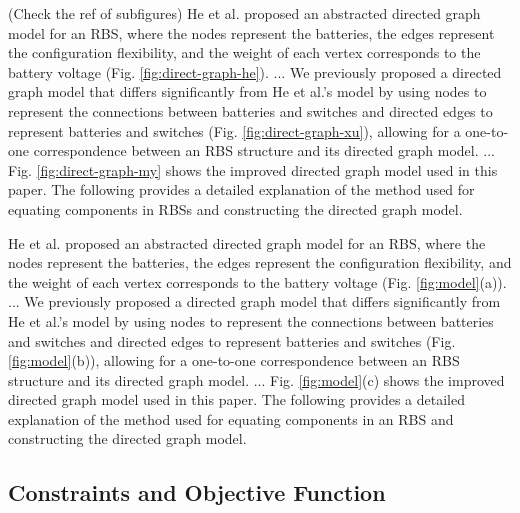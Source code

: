 \documentclass[a4paper]{article}
\begin{document}
(Check the ref of subfigures)
He et al. \cite{heExploringAdaptiveReconfiguration2013} proposed an abstracted directed graph model for an RBS, where the nodes represent the batteries, the edges represent the configuration flexibility, and the weight of each vertex corresponds to the battery voltage (Fig. \ref{fig:direct-graph-he}). 
...
We previously proposed a directed graph model that differs significantly from He et al.'s model by using nodes to represent the connections between batteries and switches and directed edges to represent batteries and switches (Fig. \ref{fig:direct-graph-xu}), allowing for a one-to-one correspondence between an RBS structure and its directed graph model. 
...
Fig. \ref{fig:direct-graph-my} shows the improved directed graph model used in this paper.
The following provides a detailed explanation of the method used for equating components in RBSs and constructing the directed graph model.


He et al. \cite{heExploringAdaptiveReconfiguration2013} proposed an abstracted directed graph model for an RBS, where the nodes represent the batteries, the edges represent the configuration flexibility, and the weight of each vertex corresponds to the battery voltage (Fig. \ref{fig:model}(a)). 
...
We previously proposed a directed graph model that differs significantly from He et al.'s model by using nodes to represent the connections between batteries and switches and directed edges to represent batteries and switches (Fig. \ref{fig:model}(b)), allowing for a one-to-one correspondence between an RBS structure and its directed graph model. 
...
Fig. \ref{fig:model}(c) shows the improved directed graph model used in this paper.
The following provides a detailed explanation of the method used for equating components in an RBS and constructing the directed graph model.


\subsection{Constraints and Objective Function}
\end{document}
